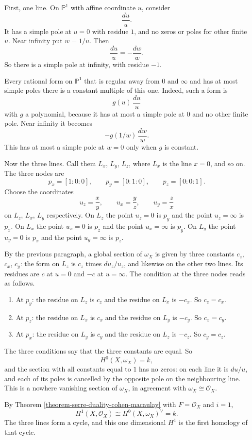 First, one line. On $\mathbb{P}^1$ with
affine coordinate $u$, consider
$$
\frac{du}{u}.
$$
It has a simple pole at $u=0$ with
residue $1$, and no zeros or poles for
other finite $u$. Near infinity put
$w=1/u$. Then
$$
\frac{du}{u}=-\frac{dw}{w}.
$$
So there is a simple pole at infinity,
with residue $-1$.

Every rational form on $\mathbb{P}^1$
that is regular away from $0$ and
$\infty$ and has at most simple poles
there is a constant multiple of this
one. Indeed, such a form is
$$
g(u)\,\frac{du}{u}
$$
with $g$ a polynomial, because it has at
most a simple pole at $0$ and no other
finite pole. Near infinity it becomes
$$
-g(1/w)\,\frac{dw}{w}.
$$
This has at most a simple pole at $w=0$
only when $g$ is constant.

Now the three lines. Call them $L_x$,
$L_y$, $L_z$, where $L_x$ is the line
$x=0$, and so on. The three nodes are
$$
p_x=[1:0:0],\qquad
p_y=[0:1:0],\qquad
p_z=[0:0:1].
$$
Choose the coordinates
$$
u_z=\frac{x}{y},\qquad
u_x=\frac{y}{z},\qquad
u_y=\frac{z}{x}
$$
on $L_z$, $L_x$, $L_y$ respectively. On
$L_z$ the point $u_z=0$ is $p_y$ and the
point $u_z=\infty$ is $p_x$. On $L_x$ the
point $u_x=0$ is $p_z$ and the point
$u_x=\infty$ is $p_y$. On $L_y$ the point
$u_y=0$ is $p_x$ and the point
$u_y=\infty$ is $p_z$.

By the previous paragraph, a global
section of $\omega_X$ is given by three
constants $c_z$, $c_x$, $c_y$: the form
on $L_z$ is $c_z$ times $du_z/u_z$, and
likewise on the other two lines. Its
residues are $c$ at $u=0$ and $-c$ at
$u=\infty$. The condition at the three
nodes reads as follows.
\begin{enumerate}
\item At $p_y$: the residue on $L_z$ is
$c_z$ and the residue on $L_x$ is $-c_x$.
So $c_z=c_x$.
\item At $p_z$: the residue on $L_x$ is
$c_x$ and the residue on $L_y$ is $-c_y$.
So $c_x=c_y$.
\item At $p_x$: the residue on $L_y$ is
$c_y$ and the residue on $L_z$ is $-c_z$.
So $c_y=c_z$.
\end{enumerate}
The three conditions say that the three
constants are equal. So
$$
H^0(X,\omega_X)=k,
$$
and the section with all constants equal
to $1$ has no zeros: on each line it is
$du/u$, and each of its poles is
cancelled by the opposite pole on the
neighbouring line. This is a nowhere
vanishing section of $\omega_X$, in
agreement with
$\omega_X\cong\mathcal{O}_X$.

By Theorem
\ref{theorem-serre-duality-cohen-macaulay}
with $F=\mathcal{O}_X$ and $i=1$,
$$
H^1(X,\mathcal{O}_X)\cong
H^0(X,\omega_X)^\vee=k.
$$
The three lines form a cycle, and this
one dimensional $H^1$ is the first
homology of that cycle.

